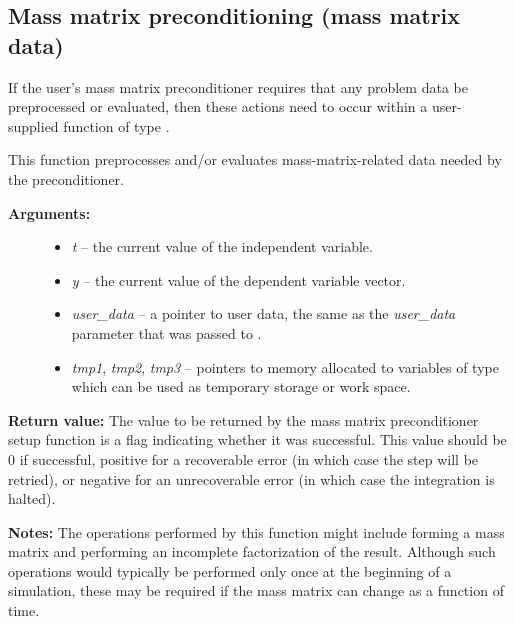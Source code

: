 \documentclass[letterpaper,10pt,english]{sphinxmanual}
\begin{document}
\subsection{Mass matrix preconditioning (mass matrix data)}
\label{c_interface/User_supplied:cinterface-masprecsetupfn}\label{c_interface/User_supplied:mass-matrix-preconditioning-mass-matrix-data}
If the user's mass matrix preconditioner requires that any problem
data be preprocessed or evaluated, then these actions need to occur
within a user-supplied function of type
{\hyperref[c_interface/User_supplied:ARKSpilsMassPrecSetupFn]{}}.

\begin{fulllineitems}
\label{c_interface/User_supplied:ARKSpilsMassPrecSetupFn}
This function preprocesses and/or evaluates mass-matrix-related
data needed by the preconditioner.
\begin{description}
\item[{\textbf{Arguments:}}] \leavevmode\begin{itemize}
\item {} 
\emph{t} -- the current value of the independent variable.

\item {} 
\emph{y} -- the current value of the dependent variable vector.

\item {} 
\emph{user\_data} -- a pointer to user data, the same as the
\emph{user\_data} parameter that was passed to {\hyperref[c_interface/User_callable:ARKodeSetUserData]{}}.

\item {} 
\emph{tmp1}, \emph{tmp2}, \emph{tmp3} -- pointers to memory allocated to
variables of type  which can be used as temporary
storage or work space.

\end{itemize}

\end{description}

\textbf{Return value:}
The value to be returned by the mass matrix preconditioner setup
function is a flag indicating whether it was successful. This value
should be 0 if successful, positive for a recoverable error (in
which case the step will be retried), or negative for an
unrecoverable error (in which case the integration is halted).

\textbf{Notes:}  The operations performed by this function might include
forming a mass matrix and performing an incomplete
factorization of the result.  Although such operations would
typically be performed only once at the beginning of a simulation,
these may be required if the mass matrix can change as a function
of time.

\end{fulllineitems}
\end{document}
